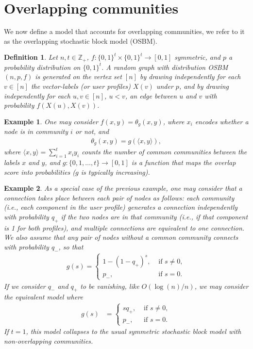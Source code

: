 \documentclass[11pt]{article}
\newcommand{\mZ}{\mathbb{Z}}
\newcommand{\1}{\mathbb{1}}
\newtheorem{definition}{Definition}
\newtheorem{example}{Example}
\begin{document}
\section{Overlapping communities}\label{overlap}
We now define a model that accounts for overlapping communities, we refer to it as the overlapping stochastic block model (OSBM). 
\begin{definition}
Let $n,t \in \mZ_+$, $f: \{0,1\}^t \times \{0,1\}^t \to [0,1]$ symmetric, and $p$ a probability distribution on $\{0,1\}^t$. A random graph with distribution OSBM$(n,p,f)$ is generated on the vertex set $[n]$ by drawing independently for each $v \in [n]$ the vector-labels (or user profiles) $X(v)$ under $p$, and by drawing independently for each $u,v \in [n]$, $u < v$, an edge between $u$ and $v$ with probability $f(X(u),X(v))$.
\end{definition}
\begin{example}\label{common}
One may consider $f(x,y)= \theta_g(x,y)$, where $x_i$ encodes whether a node is in community $i$ or not, and 
\begin{align}
\theta_g(x,y)= g(\langle x , y \rangle),
\end{align}
where $\langle x , y \rangle = \sum_{i=1}^t x_i y_i$ counts the number of common communities between the labels $x$ and $y$, and $g:\{0,1,\dots, t\} \to [0,1]$ is a function that maps the overlap score into probabilities ($g$ is typically increasing). 
\end{example}
\begin{example}
As a special case of the previous example, one may consider that a connection takes place between each pair of nodes as follows: 
each community (i.e., each component in the user profile) generates a connection independently with probability $q_+$ if the two nodes are in that community (i.e., if that component is 1 for both profiles), and multiple connections are equivalent to one connection. We also assume that any pair of nodes without a common community connects with probability $q_-$, so that   
\begin{align}
g(s)=
\begin{cases}
1- (1-q_+)^s, &\text{ if } s \neq 0,\\
p_-, &\text{ if } s=0.
\end{cases}
\end{align}
If we consider $q_-$ and $q_+$ to be vanishing, like $O(\log(n)/n)$, we may consider the equivalent model where
\begin{align}
g(s)&=
\begin{cases}
sq_+, &\text{ if } s \neq 0,\\
p_-, &\text{ if } s=0.
\end{cases}
\end{align}
If $t=1$, this model collapses to the usual symmetric stochastic block model with non-overlapping communities. 
\end{example}
\end{document}
